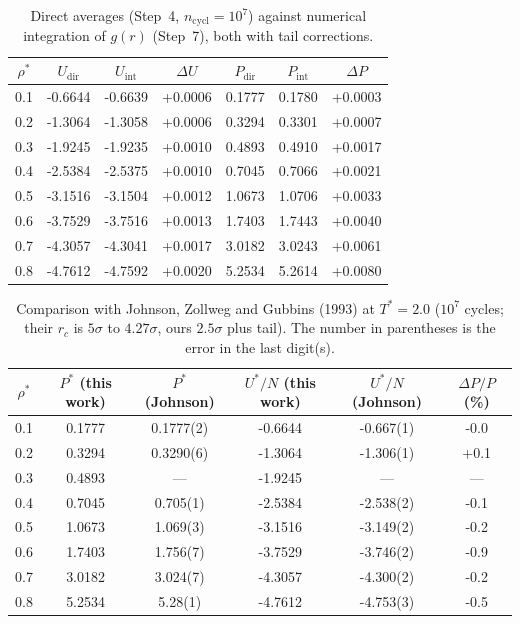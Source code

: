 \begin{table}[H]\centering\small
\caption{Direct averages (Step~4, $n_{\mathrm{cycl}}=10^7$) against numerical integration of $g(r)$ (Step~7), both with tail corrections.}
\label{tab:integral}\begin{tabular}{ccccccc}\hline
$\rho^*$ & $U_{\mathrm{dir}}$ & $U_{\mathrm{int}}$ & $\Delta U$ & $P_{\mathrm{dir}}$ & $P_{\mathrm{int}}$ & $\Delta P$ \\ \hline
0.1 & -0.6644 & -0.6639 & +0.0006 & 0.1777 & 0.1780 & +0.0003 \\
0.2 & -1.3064 & -1.3058 & +0.0006 & 0.3294 & 0.3301 & +0.0007 \\
0.3 & -1.9245 & -1.9235 & +0.0010 & 0.4893 & 0.4910 & +0.0017 \\
0.4 & -2.5384 & -2.5375 & +0.0010 & 0.7045 & 0.7066 & +0.0021 \\
0.5 & -3.1516 & -3.1504 & +0.0012 & 1.0673 & 1.0706 & +0.0033 \\
0.6 & -3.7529 & -3.7516 & +0.0013 & 1.7403 & 1.7443 & +0.0040 \\
0.7 & -4.3057 & -4.3041 & +0.0017 & 3.0182 & 3.0243 & +0.0061 \\
0.8 & -4.7612 & -4.7592 & +0.0020 & 5.2534 & 5.2614 & +0.0080 \\
\hline\end{tabular}\end{table}
\begin{table}[H]\centering\small
\caption{Comparison with Johnson, Zollweg and Gubbins (1993) at $T^*=2.0$ ($10^7$ cycles; their $r_c$ is $5\sigma$ to $4.27\sigma$, ours $2.5\sigma$ plus tail). The number in parentheses is the error in the last digit(s).}
\label{tab:johnson}\begin{tabular}{cccccc}\hline
$\rho^*$ & $P^*$ (this work) & $P^*$ (Johnson) & $U^*/N$ (this work) & $U^*/N$ (Johnson) & $\Delta P/P$ (\%) \\ \hline
0.1 & 0.1777 & 0.1777(2) & -0.6644 & -0.667(1) & -0.0 \\
0.2 & 0.3294 & 0.3290(6) & -1.3064 & -1.306(1) & +0.1 \\
0.3 & 0.4893 & --- & -1.9245 & --- & --- \\
0.4 & 0.7045 & 0.705(1) & -2.5384 & -2.538(2) & -0.1 \\
0.5 & 1.0673 & 1.069(3) & -3.1516 & -3.149(2) & -0.2 \\
0.6 & 1.7403 & 1.756(7) & -3.7529 & -3.746(2) & -0.9 \\
0.7 & 3.0182 & 3.024(7) & -4.3057 & -4.300(2) & -0.2 \\
0.8 & 5.2534 & 5.28(1) & -4.7612 & -4.753(3) & -0.5 \\
\hline\end{tabular}\end{table}
